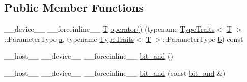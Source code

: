 \subsection*{Public Member Functions}
\begin{DoxyCompactItemize}
\item 
\-\_\-\-\_\-device\-\_\-\-\_\- \-\_\-\-\_\-forceinline\-\_\-\-\_\- \hyperlink{calib3d_8hpp_a3efb9551a871ddd0463079a808916717}{T} \hyperlink{structcv_1_1gpu_1_1device_1_1bit__and_a3b8804be5ffe1b1f8ac7fa90e62d76f7}{operator()} (typename \hyperlink{structcv_1_1gpu_1_1device_1_1TypeTraits}{Type\-Traits}$<$ \hyperlink{calib3d_8hpp_a3efb9551a871ddd0463079a808916717}{T} $>$\-::Parameter\-Type \hyperlink{legacy_8hpp_a1031d0e0a97a340abfe0a6ab9e831045}{a}, typename \hyperlink{structcv_1_1gpu_1_1device_1_1TypeTraits}{Type\-Traits}$<$ \hyperlink{calib3d_8hpp_a3efb9551a871ddd0463079a808916717}{T} $>$\-::Parameter\-Type \hyperlink{legacy_8hpp_ac04272e8ca865b8fba18d36edae9fd2a}{b}) const 
\item 
\-\_\-\-\_\-host\-\_\-\-\_\- \-\_\-\-\_\-device\-\_\-\-\_\- \-\_\-\-\_\-forceinline\-\_\-\-\_\- \hyperlink{structcv_1_1gpu_1_1device_1_1bit__and_a8ff25dfce54d3e6bc7995c2796e99820}{bit\-\_\-and} ()
\item 
\-\_\-\-\_\-host\-\_\-\-\_\- \-\_\-\-\_\-device\-\_\-\-\_\- \-\_\-\-\_\-forceinline\-\_\-\-\_\- \hyperlink{structcv_1_1gpu_1_1device_1_1bit__and_acee55db6551aff5a7638a274ff3bf789}{bit\-\_\-and} (const \hyperlink{structcv_1_1gpu_1_1device_1_1bit__and}{bit\-\_\-and} \&)
\end{DoxyCompactItemize}


